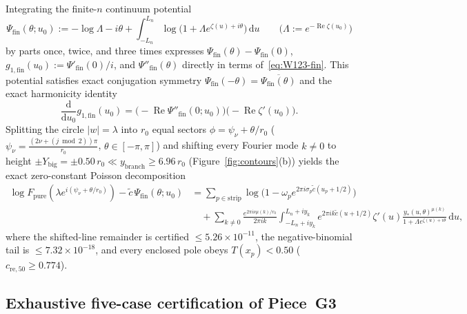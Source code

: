 \documentclass[10pt]{article}
\numberwithin{equation}{section}
\theoremstyle{plain}
\theoremstyle{definition}
\newcommand{\dd}{\mathrm{d}}
\newcommand{\1}{\mathbf{1}}
\DeclareMathOperator{\re}{Re}
\begin{document}
Integrating the finite-$n$ continuum potential
\begin{equation}\label{eq:Psi-fin}
\Psi_{\mathrm{fin}}(\theta; u_0) := -\log\Lambda - i\theta + \int_{-L_n}^{L_n} \log\bigl(1 + \Lambda e^{\zeta(u) + i\theta}\bigr)\,\dd u \qquad \bigl(\Lambda := e^{-\re\zeta(u_0)}\bigr)
\end{equation}
by parts once, twice, and three times expresses $\Psi_{\mathrm{fin}}(\theta) - \Psi_{\mathrm{fin}}(0)$, $g_{1,\mathrm{fin}}(u_0) := \Psi'_{\mathrm{fin}}(0)/i$, and $\Psi''_{\mathrm{fin}}(\theta)$ directly in terms of~\eqref{eq:W123-fin}. This potential satisfies exact conjugation symmetry $\Psi_{\mathrm{fin}}(-\theta) = \overline{\Psi_{\mathrm{fin}}(\theta)}$ and the exact harmonicity identity
\begin{equation}\label{eq:harmonicity}
\frac{\dd}{\dd u_0} g_{1,\mathrm{fin}}(u_0) = \bigl(-\re\Psi''_{\mathrm{fin}}(0; u_0)\bigr)\bigl(-\re\zeta'(u_0)\bigr).
\end{equation}
Splitting the circle $|w| = \lambda$ into $r_0$ equal sectors $\phi = \psi_\nu + \theta/r_0$ ($\psi_\nu = \frac{(2\nu + (j \bmod 2))\pi}{r_0}$, $\theta \in [-\pi, \pi]$) and shifting every Fourier mode $k \ne 0$ to height $\pm Y_{\mathrm{big}} = \pm 0.50\, r_0 \ll y_{\mathrm{branch}} \ge 6.96\, r_0$ (Figure~\ref{fig:contours}(b)) yields the exact zero-constant Poisson decomposition
\begin{equation}\label{eq:poisson-G3}
\begin{aligned}
\log F_{\mathrm{pure}}(\lambda e^{i(\psi_\nu + \theta/r_0)}) - \tilde{c}\,\Psi_{\mathrm{fin}}(\theta; u_0)
&= \sum_{p \in \mathrm{strip}} \log\!\bigl(1 - \omega_p e^{2\pi i \sigma_p \tilde{c}(u_p + 1/2)}\bigr) \\
&\quad + \sum_{k \ne 0} \frac{e^{2\pi i \nu \mu(k)/r_0}}{2\pi i k}\int_{-L_n+i y_k}^{L_n+i y_k} e^{2\pi i k \tilde{c}(u + 1/2)}\zeta'(u)\frac{y_*(u, \theta)^{\mu(k)}}{1 + \Lambda e^{\zeta(u)+i\theta}}\,\dd u,
\end{aligned}
\end{equation}
where the shifted-line remainder is certified $\le 5.26 \times 10^{-11}$, the negative-binomial tail is $\le 7.32 \times 10^{-18}$, and every enclosed pole obeys $T(x_p) < 0.50$ ($c_{\mathrm{re},50} \ge 0.774$).

\subsection{Exhaustive five-case certification of Piece~G3}
\label{sec:G3-cert}
\end{document}
